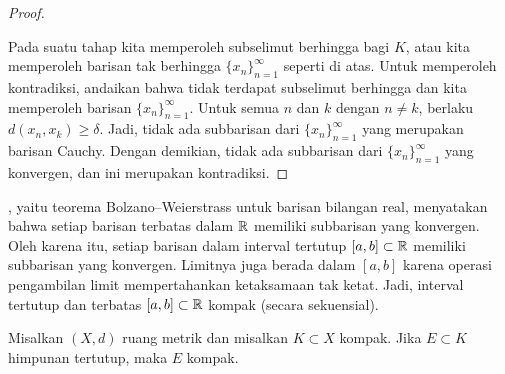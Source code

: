 \begin{proof}
\begin{myfigureht}
\caption{Menyelimuti $K$ dengan $U_{\lambda}$.  Titik-titik
$x_1,x_2,x_3,x_4$, 
ketiga himpunan 
$U_{\lambda_1}$,
$U_{\lambda_2}$,
$U_{\lambda_3}$,
dan 
ketiga bola pertama
yang berjari-jari $\delta$ digambar.\label{fig:seqcompactiscompact}}
\end{myfigureht}

Pada suatu tahap kita memperoleh subselimut berhingga bagi $K$,
atau kita memperoleh
barisan tak berhingga
$\{ x_n \}_{n=1}^\infty$ seperti di atas.
Untuk memperoleh kontradiksi, andaikan bahwa
tidak terdapat subselimut berhingga dan kita memperoleh barisan $\{ x_n \}_{n=1}^\infty$.
Untuk semua $n$ dan $k$ dengan $n \neq k$, 
berlaku $d(x_n,x_k) \geq \delta$.
Jadi, tidak ada subbarisan dari $\{ x_n \}_{n=1}^\infty$ yang merupakan barisan Cauchy.
Dengan demikian, tidak ada subbarisan dari $\{ x_n \}_{n=1}^\infty$ yang konvergen,
dan ini merupakan kontradiksi.
\end{proof}

\begin{example} \label{example:intervalcompact}
,
yaitu teorema Bolzano--Weierstrass untuk barisan bilangan real,
menyatakan bahwa setiap barisan terbatas dalam ${\mathbb{R}}$ memiliki
subbarisan yang konvergen.  Oleh karena itu, setiap barisan dalam interval tertutup $[a,b] \subset {\mathbb{R}}$ memiliki 
subbarisan yang konvergen.  Limitnya juga berada dalam $[a,b]$ karena operasi pengambilan limit
mempertahankan ketaksamaan tak ketat.  Jadi, interval tertutup dan terbatas $[a,b]
\subset {\mathbb{R}}$ kompak (secara sekuensial).
\end{example}

\begin{prop} \label{prop:closedsubsetcompact}
Misalkan $(X,d)$ ruang metrik dan misalkan $K \subset X$ kompak.  Jika
$E \subset K$ himpunan tertutup, maka $E$ kompak.
\end{prop}

